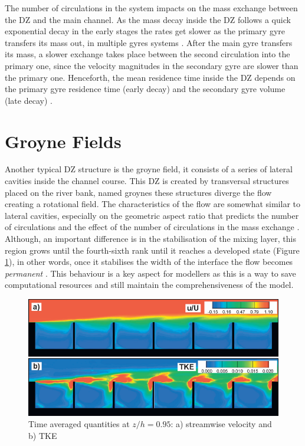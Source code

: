 The number of circulations in the system impacts on the mass exchange between the DZ and the main channel. As the mass decay inside the DZ follows a quick exponential decay in the early stages the rates get slower as the primary gyre transfers its mass out, in multiple gyres systems \cite{jackson2012}. After the main gyre transfers its mass, a slower exchange takes place between the second circulation into the primary one, since the velocity magnitudes in the secondary gyre are slower than the primary one. Henceforth, the mean residence time inside the DZ depends on the primary gyre residence time (early decay) and the secondary gyre volume (late decay) \cite{jackson2013}.

\section{Groyne Fields}
Another typical DZ structure is the groyne field, it consists of a series of lateral cavities inside the channel course. This DZ is created by transversal structures placed on the river bank, named groynes these structures diverge the flow creating a rotational field. The characteristics of the flow are somewhat similar to lateral cavities, especially on the geometric aspect ratio that predicts the number of circulations \cite{weitbrecht2004,uijttewaal2005,xiang2020} and the effect of the number of circulations in the mass exchange \cite{deOliveira2020}. Although, an important difference is in the stabilisation of the mixing layer, this region grows until the fourth-sixth rank until it reaches a developed state (Figure \ref{fig:groyneStabilisation}), in other words, once it stabilises the width of the interface the flow becomes \textit{permanent} \cite{weitbrecht2004, mcCoy2008, xiang2020}. This behaviour is a key aspect for modellers as this is a way to save computational resources and still maintain the comprehensiveness of the model.

\begin{figure}[!ht]
\centering
\includegraphics[width=0.9\linewidth]{../images/introduction/groyneStabilisation.png}
\caption{Time averaged quantities at $z/h=0.95$: a) streamwise velocity and b) TKE \cite{mcCoy2008}}
\label{fig:groyneStabilisation}
\end{figure}

